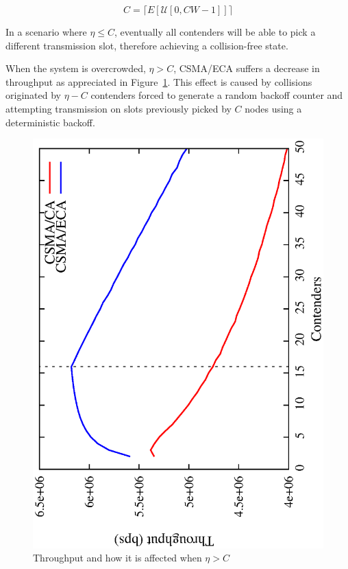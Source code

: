 
\begin{equation} \label{eq:capacity}	
	C = \lceil{E[\mathcal{U}[0, CW - 1]]}\rceil
\end{equation}

In a scenario where $\eta \leq C$, eventually all contenders will be able to pick a different transmission slot, therefore achieving a collision-free state.

When the system is overcrowded, $\eta>C$, CSMA/ECA suffers a decrease in throughput as appreciated in Figure~\ref{fig:throughput}. This effect is caused by collisions originated by $\eta-C$ contenders forced to generate a random backoff counter and attempting transmission on slots previously picked by $C$ nodes using a deterministic backoff.


\begin{figure}[htbp]
  \centering
  \includegraphics[width=0.7\linewidth, angle = -90]{figures/throughput/throughput.eps}
  \caption{Throughput and how it is affected when $\eta > C$
  \label{fig:throughput}}
\end{figure}


